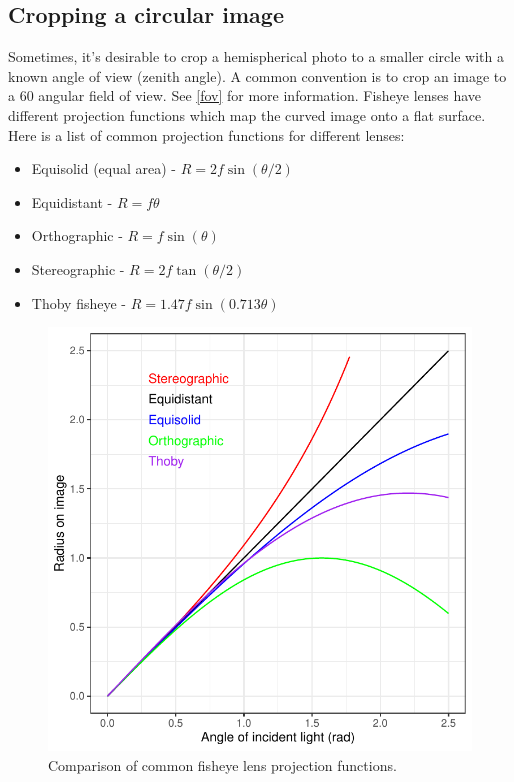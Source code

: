 \documentclass[11pt,a4paper]{article}
\newcommand\file[1]{\texttt{\underline{#1}}}
\begin{document}
\begin{minipage}{\linewidth}

\end{minipage}

\subsection{Cropping a circular image} \label{circle}

Sometimes, it's desirable to crop a hemispherical photo to a smaller circle with a known angle of view (zenith angle). A common convention is to crop an image to a 60\textdegree{} angular field of view. See \autoref{fov} for more information. Fisheye lenses have different projection functions which map the curved image onto a flat surface. Here is a list of common projection functions for different lenses:

\begin{itemize}
	\item{Equisolid (equal area) - $R = 2f\sin{(\theta/2)}$}
	\item{Equidistant - $R = f\theta$}
	\item{Orthographic - $R = f\sin{(\theta)}$}
	\item{Stereographic - $R = 2f\tan{(\theta/2)}$}
	\item{Thoby fisheye - $R = 1.47f\sin{(0.713\theta)}$}
\end{itemize}

\begin{figure}[H]
	\includegraphics[width=\textwidth]{lens_proj}
	\caption{Comparison of common fisheye lens projection functions.}
	\label{lens_proj}
\end{figure}
\end{document}

